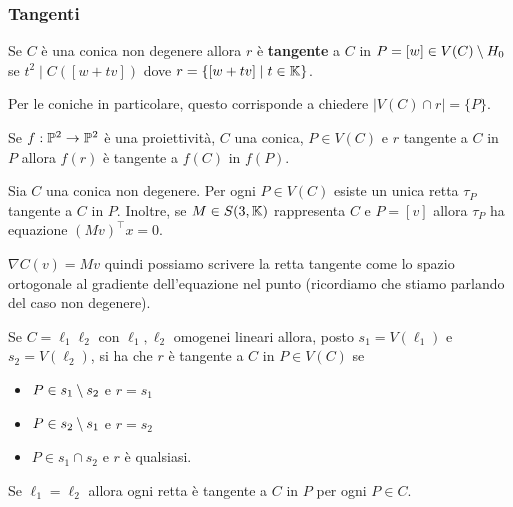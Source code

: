 \begin{multicols*}{2}
    \subsubsection{Tangenti}
    \begin{definition}
    Se $C$ \`e una conica non degenere allora $r$ \`e \textbf{tangente} a $C$ in $P=[w]\in V(C)\setminus H_0$ se $t^2\mid C([w+tv])$ dove $r=\{[w+tv]\mid t\in \mathbb{K}\}$.
    \end{definition}
    \begin{remark}
    Per le coniche in particolare, questo corrisponde a chiedere $|V(C)\cap r|=\{P\}$.
    \end{remark}

    \begin{remark}
    Se $f:\mathbb{P}^2\to\mathbb{P}^2$ \`e una proiettivit\`a, $C$ una conica, $P\in V(C)$ e $r$ tangente a $C$ in $P$ allora $f(r)$ \`e tangente a $f(C)$ in $f(P)$.
    \end{remark}
    \begin{proposition}
    Sia $C$ una conica non degenere. Per ogni $P\in V(C)$ esiste un unica retta $\tau_P$ tangente a $C$ in $P$. Inoltre, se $M\in S(3,\mathbb{K})$ rappresenta $C$ e $P=[v]$ allora $\tau_P$ ha equazione $(Mv)^\top x=0$.
    \end{proposition}

    \begin{remark}
    $\nabla C(v)=Mv$ quindi possiamo scrivere la retta tangente come lo spazio ortogonale al gradiente dell'equazione nel punto (ricordiamo che stiamo parlando del caso non degenere).
    \end{remark}


    \begin{definition}
    Se $C=\ell_1\ell_2$ con $\ell_1,\ell_2$ omogenei lineari allora, posto $s_1=V(\ell_1)$ e $s_2=V(\ell_2)$, si ha che $r$ \`e tangente a $C$ in $P\in V(C)$ se
    \begin{itemize}[noitemsep]
    \item $P\in s_1\setminus s_2$ e $r=s_1$
    \item $P\in s_2\setminus s_1$ e $r=s_2$
    \item $P\in s_1\cap s_2$ e $r$ \`e qualsiasi.
    \end{itemize}
    \end{definition}
    \begin{remark}
    Se $\ell_1=\ell_2$ allora ogni retta \`e tangente a $C$ in $P$ per ogni $P\in C$.
    \end{remark}


\end{multicols*}
